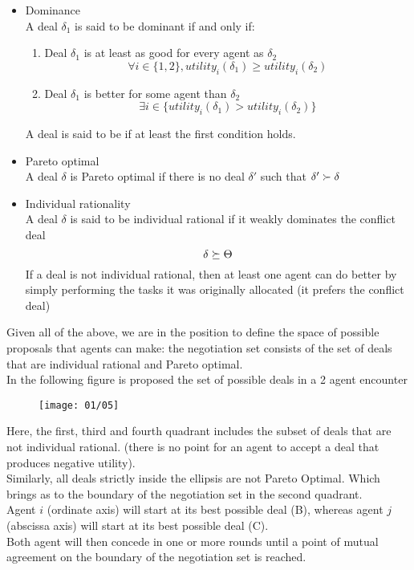 \begin{itemize}
\item Dominance\\
A deal $\delta_1$ is said to be dominant if and only if:
\begin{enumerate}
\item Deal $\delta_1$ is at least as good for every agent as $\delta_2$
\[\forall i \in \{1,2\}, utility_i(\delta_1) \ge utility_i(\delta_2)\]
\item Deal $\delta_1$ is better for some agent than $\delta_2$
\[\exists i \in \{ utility_i(\delta_1) > utility_i(\delta_2)\}\]
\end{enumerate}
A deal is said to be  if at least the first condition holds.
\item Pareto optimal\\
A deal $\delta$ is Pareto optimal if there is no deal $\delta'$ such that $\delta' \succ \delta$
\item Individual rationality\\
A deal $\delta$ is said to be individual rational if it weakly dominates the conflict deal
\[\delta \succeq \Theta\]
If a deal is not individual rational, then at least one agent can do better by simply performing the tasks it was originally allocated (it prefers the conflict deal)
\end{itemize}

Given all of the above, we are in the position to define the space of possible proposals that agents can make: the negotiation set consists of the set of deals that are individual rational and Pareto optimal.\\
In the following figure is proposed the set of possible deals in a 2 agent encounter

\begin{figure}[!h]
\centering 
\texttt{[image: 01/05]}
\end{figure}
Here, the first, third and fourth quadrant includes the subset of deals that are not individual rational. (there is no point for an agent to accept a deal that produces negative utility).\\
Similarly, all deals strictly inside the ellipsis are not Pareto Optimal. Which brings as to the boundary of the negotiation set in the second quadrant.\\
Agent $i$ (ordinate axis) will start at its best possible deal (B), whereas agent $j$ (abscissa axis) will start at its best possible deal (C).\\
Both agent will then concede in one or more rounds until a point of mutual agreement on the boundary of the negotiation set is reached.

